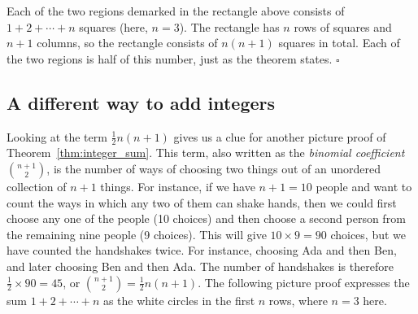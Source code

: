 
\newcommand{\mycircle}[2]{\fill[fill=white!75!gray,draw=black] (#1,#2) circle (3mm);}

\newcommand\xc{1.73}
\newcommand\zc{1}
\newcommand\nn{3} %

\begin{center}
\end{center}

Each of the two regions demarked in the rectangle above
consists of $1 + 2 + \cdots + n$ squares (here, $n = 3$).
The rectangle has $n$ rows of squares and $n+1$ columns,
so the rectangle consists of $n(n+1)$ squares in total.
Each of the two regions is half of this number,
just as the theorem states.  \hfill$\square$

\medskip

\subsection*{A different way to add integers}
\noindent
Looking at the term $\frac{1}{2}n(n+1)$ gives us a clue for another picture proof
of Theorem~\ref{thm:integer_sum}.
This term, also written as the {\em binomial coefficient} $\binom{n+1}{2}$,
is the number of ways of choosing two things out of an unordered collection of $n+1$ things.
For instance, if we have $n + 1 = 10$ people and want to count the ways in which any two of them
can shake hands, then we could first choose any one of the people (10 choices)
and then choose a second person from the remaining nine people (9 choices).
This will give $10\times 9 = 90$ choices, but we have counted the handshakes twice.
For instance, choosing Ada and then Ben, and later choosing Ben and then Ada.
The number of handshakes is therefore $\frac{1}{2}\times 90 = 45$, or $\binom{n+1}{2} = \frac{1}{2}n(n+1)$.
The following picture proof expresses the sum $1 + 2 + \cdots + n$ as
the white circles in the first $n$ rows, where $n=3$ here.

